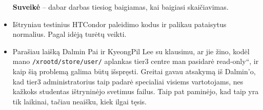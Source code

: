 \documentclass[a4paper, 12pt]{article}
\newcommand{\ltq}[1]{{\quotedblbase{}#1\textquotedblleft{}}}
\newcommand{\ttt}[1]{\texttt{#1}}
\begin{document}
\begin{itemize}
	\textbf{Suveikė} -- dabar darbas tiesiog baigiamas, kai baigiasi skaičiavimas.
	\item Ištryniau testinius HTCondor paleidimo kodus ir palikau pataisytus
	normalius. Pagal idėją turėtų veikti.
	\item Parašiau laišką Dalmin Pai ir KyeongPil Lee su klausimu, ar jie žino,
	kodėl mano \ttt{/xrootd/store/user/} aplankas tier3 centre man pasidarė
	\ltq{read-only}, ir kaip šią problemą galima būtų išspręsti. Greitai gavau
	atsakymą iš Dalmin'o, kad tier3 administratorius taip padarė specialiai visiems
	vartotojams, nes kažkoks studentas ištryninėjo svetimus failus. Taip pat paminėjo,
	kad taip yra tik laikinai, tačiau neaišku, kiek ilgai tęsis.
\end{itemize}



\end{document}
